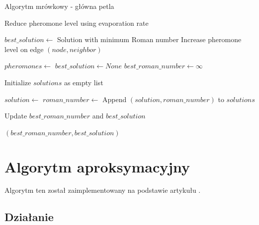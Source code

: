 \begin{algorithm}
    \caption*{Algorytm mrówkowy - główna petla}
    \begin{algorithmic}[1]
    
            \State Reduce pheromone level using evaporation rate
        \EndFor

        \State $best\_solution \gets$ Solution with minimum Roman number
                \State Increase pheromone level on edge $(node, neighbor)$
            \EndFor
        \EndFor
    \EndFunction

        \State $pheromones \gets$ 
        \State $best\_solution \gets None$
        \State $best\_roman\_number \gets \infty$

            \State Initialize $solutions$ as empty list

                \State $solution \gets$ 
                \State $roman\_number \gets$ 
                \State Append $(solution, roman\_number)$ to $solutions$

                    \State Update $best\_roman\_number$ and $best\_solution$
                \EndIf
            \EndFor

            \State {}
        \EndFor

        \State \Return $(best\_roman\_number, best\_solution)$
    \EndFunction
    
    \end{algorithmic}
\end{algorithm}

\FloatBarrier
\section{Algorytm aproksymacyjny}

Algorytm ten został zaimplementowany na podstawie artykułu \cite{ILP}.

\subsection{Działanie}

